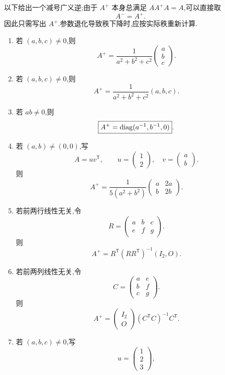 \begin{solution}
以下给出一个减号广义逆;由于 $A^+$ 本身总满足 $AA^+A=A$,可以直接取
\[
A^-=A^+.
\]
因此只需写出 $A^+$.参数退化导致秩下降时,应按实际秩重新计算.

\begin{enumerate}
  \item 若 $(a,b,c)\neq0$,则
  \[
  \boxed{
  A^+=\dfrac{1}{a^2+b^2+c^2}
  \begin{pmatrix}a\\b\\c\end{pmatrix}
  }.
  \]
  \item 若 $(a,b,c)\neq0$,则
  \[
  \boxed{
  A^+=\dfrac{1}{a^2+b^2+c^2}(a,b,c)
  }.
  \]
  \item 若 $ab\neq0$,则
  \[
  \boxed{A^+=\operatorname{diag}(a^{-1},b^{-1},0)}.
  \]
  \item 若 $(a,b)\neq(0,0)$,写
  \[
  A=uv^{\mathsf T},
  \qquad
  u=\begin{pmatrix}1\\2\end{pmatrix},
  \quad
  v=\begin{pmatrix}a\\b\end{pmatrix}.
  \]
  则
  \[
  \boxed{
  A^+
  =\dfrac{1}{5(a^2+b^2)}
  \begin{pmatrix}
a&2a\\b&2b
\end{pmatrix}
  }.
  \]
  \item 若前两行线性无关,令
  \[
  R=\begin{pmatrix}a&b&c\\e&f&g\end{pmatrix}.
  \]
  则
  \[
  \boxed{
  A^+=R^{\mathsf T}(RR^{\mathsf T})^{-1}(I_2,O)
  }.
  \]
  \item 若前两列线性无关,令
  \[
  C=\begin{pmatrix}a&e\\b&f\\c&g\end{pmatrix}.
  \]
  则
  \[
  \boxed{
  A^+=
  \begin{pmatrix}I_2\\O\end{pmatrix}
  (C^{\mathsf T}C)^{-1}C^{\mathsf T}
  }.
  \]
  \item 若 $(a,b,c)\neq0$,写
  \[
  u=\begin{pmatrix}1\\2\\3\end{pmatrix},
\]
\end{enumerate}
\end{solution}
